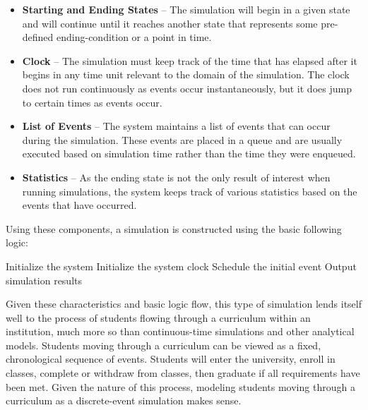 \documentclass[botnum, fleqn]{unmeethesis}
\begin{document}
    \begin{itemize}
    \item \textbf{Starting and Ending States} -- The simulation will begin in a given state and will continue until it reaches another state that represents some pre-defined ending-condition or a point in time.
    \item \textbf{Clock} -- The simulation must keep track of the time that has elapsed after it begins in any time unit relevant to the domain of the simulation. The clock does not run continuously as events occur instantaneously, but it does jump to certain times as events occur.
    \item \textbf{List of Events} -- The system maintains a list of events that can occur during the simulation. These events are placed in a queue and are usually executed based on simulation time rather than the time they were enqueued.
    \item \textbf{Statistics} -- As the ending state is not the only result of interest when running simulations, the system keeps track of various statistics based on the events that have occurred.
    \end{itemize}

    Using these components, a simulation is constructed using the basic following logic:

    \begin{algorithmic}[1]
    \STATE Initialize the system
    \STATE Initialize the system clock
    \STATE Schedule the initial event
    \ENDWHILE
    \STATE Output simulation results
    \end{algorithmic}

    Given these characteristics and basic logic flow, this type of simulation lends itself well to the process of students flowing through a curriculum within an institution, much more so than continuous-time simulations and other analytical models. Students moving through a curriculum can be viewed as a fixed, chronological sequence of events. Students will enter the university, enroll in classes, complete or withdraw from classes, then graduate if all requirements have been met. Given the nature of this process, modeling students moving through a curriculum as a discrete-event simulation makes sense.
\end{document}
